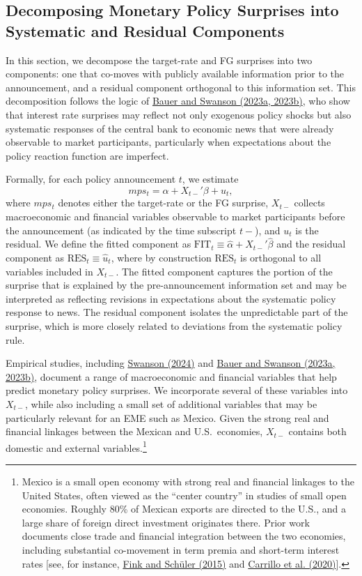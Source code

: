 \documentclass[12pt, reqno]{article}
\begin{document}
\subsection{Decomposing Monetary Policy Surprises into Systematic and Residual Components}

In this section, we decompose the target-rate and FG surprises into two components: one that co-moves with publicly available information prior to the announcement, and a residual component orthogonal to this information set. This decomposition follows the logic of 
\hyperlink{Bauer and Swanson (2023a, 2023b)}{Bauer and Swanson (2023a, 2023b)}, who show that interest rate surprises may reflect not only exogenous policy shocks but also systematic responses of the central bank to economic news that were already observable to market participants, particularly when expectations about the policy reaction function are imperfect.

Formally, for each policy announcement $t$, we estimate
\begin{equation}
mps_t = \alpha + X_{t-}'\beta + u_t,
\end{equation}
where $mps_t$ denotes either the target-rate or the FG surprise, $X_{t-}$ collects macroeconomic and financial variables observable to market participants before the announcement (as indicated by the time subscript $t-$), and $u_t$ is the residual. We define the fitted component as $\text{FIT}_t \equiv \widehat{\alpha} + X_{t-}'\widehat{\beta}$ and the residual component as $\text{RES}_t \equiv \widehat{u}_t$, where by construction $\text{RES}_t$ is orthogonal to all variables included in $X_{t-}$. The fitted component captures the portion of the surprise that is explained by the pre-announcement information set and may be interpreted as reflecting revisions in expectations about the systematic policy response to news. The residual component isolates the unpredictable part of the surprise, which is more closely related to deviations from the systematic policy rule.

Empirical studies, including \hyperlink{Swanson (2024)}{Swanson (2024)} and \hyperlink{Bauer and Swanson (2023a, 2023b)}{Bauer and Swanson (2023a, 2023b)}, document a range of macroeconomic and financial variables that help predict monetary policy surprises. We incorporate several of these variables into $X_{t-}$, while also including a small set of additional variables that may be particularly relevant for an EME such as Mexico. Given the strong real and financial linkages between the Mexican and U.S.\ economies, $X_{t-}$ contains both domestic and external variables.\footnote{Mexico is a small open economy with strong real and financial linkages to the United States, often viewed as the “center country” in studies of small open economies. Roughly 80\% of Mexican exports are directed to the U.S., and a large share of foreign direct investment originates there. Prior work documents close trade and financial integration between the two economies, including substantial co-movement in term premia and short-term interest rates [see, for instance, \hyperlink{Fink (2015)}{Fink and Schüler (2015)} and \hyperlink{Carrillo et al. (2020)}{Carrillo et al. (2020)}].}
\end{document}
